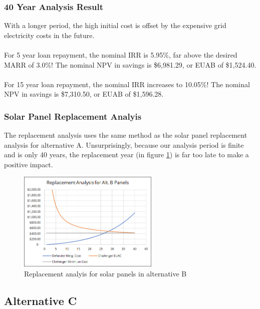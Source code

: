 \documentclass[10pt,letterpaper]{article}
\begin{document}
\subsubsection{40 Year Analysis Result}

With a longer period, the high initial cost is offset by the expensive grid electricity costs in the future.\\
\\
For 5 year loan repayment, the nominal IRR is 5.95\%, far above the desired MARR of 3.0\%! The nominal NPV in savings is \$6,981.29, or EUAB of \$1,524.40.\\
\\
For 15 year loan repayment, the nominal IRR increases to 10.05\%! The nominal NPV in savings is \$7,310.50, or EUAB of \$1,596.28.\\ 

\subsubsection{Solar Panel Replacement Analyis}

The replacement analysis uses the same method as the solar panel replacement analysis for alternative A. Unsurprisingly, because our analysis period is finite and is only 40 years, the replacement year (in figure \ref{fig:b-replacement}) is far too late to make a positive impact.\\

\begin{figure}[H]
	\centering
	\includegraphics[width=0.6\textwidth]{assets/1534568458573}
	\caption{Replacement analyis for solar panels in alternative B}
	\label{fig:b-replacement}
\end{figure}


\subsection{Alternative C}
\end{document}
